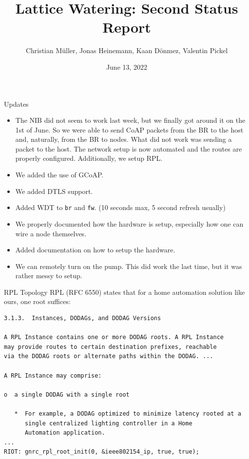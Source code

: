 \documentclass[10pt, xcolor=svgnames]{beamer}
\title{Lattice Watering: Second Status Report}
\author{Christian Müller, Jonas Heinemann, Kaan Dönmez, Valentin Pickel}
\institute{
    Software Project on Internet Communication

    Summer Term 2022
    
    Freie Universität Berlin

    Institute for Computer Science
}
\date{June 13, 2022}
\begin{document}
\maketitle

\begin{frame}{Updates}
    \begin{itemize}
        \item The NIB did not seem to work last week, but we finally got around it on the 1st of June. So we were able to send CoAP packets from the BR to the host and, naturally, from the BR to nodes. What did not work was sending a packet to the host. The network setup is now automated and the routes are properly configured. Additionally, we setup RPL.
        \item We added the use of GCoAP.
        \item We added DTLS support.
        \item Added WDT to \texttt{br} and \texttt{fw}. (10 seconds max, 5 second refresh usually)
        \item We properly documented how the hardware is setup, especially how one can wire a node themselves.
        \item Added documentation on how to setup the hardware.
        \item We can remotely turn on the pump. This did work the last time, but it was rather messy to setup.
    \end{itemize}
\end{frame}

\begin{frame}[fragile]{RPL Topology}
    RPL (RFC 6550) states that for a home automation solution like ours, one root suffices:

    \begin{verbatim}
3.1.3.  Instances, DODAGs, and DODAG Versions

A RPL Instance contains one or more DODAG roots. A RPL Instance
may provide routes to certain destination prefixes, reachable
via the DODAG roots or alternate paths within the DODAG. ...

A RPL Instance may comprise:

o  a single DODAG with a single root

   *  For example, a DODAG optimized to minimize latency rooted at a
      single centralized lighting controller in a Home
      Automation application.
...
RIOT: gnrc_rpl_root_init(0, &ieee802154_ip, true, true);
    \end{verbatim}
\end{frame}
\end{document}
